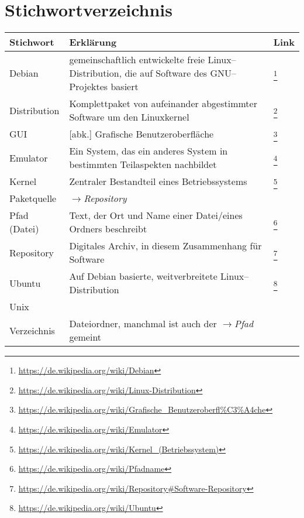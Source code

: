 \pagebreak
\section{Stichwortverzeichnis}

\begin{tabularx}{1\textwidth}{lXl}
	\textbf{Stichwort} & \textbf{Erklärung} & \textbf{Link} \\
	\hline
	Debian & gemeinschaftlich entwickelte freie Linux--Distribution, die auf Software des GNU--Projektes basiert & \footnote{\url{https://de.wikipedia.org/wiki/Debian}}\\
	Distribution & Komplettpaket von aufeinander abgestimmter Software um den Linuxkernel & \footnote{\url{https://de.wikipedia.org/wiki/Linux-Distribution}}\\
	GUI & [abk.] Grafische Benutzeroberfläche & \footnote{\url{https://de.wikipedia.org/wiki/Grafische\_Benutzeroberfl\%C3\%A4che}}\\
	Emulator & Ein System, das ein anderes System in bestimmten Teilaspekten nachbildet & \footnote{\url{https://de.wikipedia.org/wiki/Emulator}}\\
	Kernel & Zentraler Bestandteil eines Betriebssystems & \footnote{\url{https://de.wikipedia.org/wiki/Kernel\_(Betriebssystem)}}\\
	Paketquelle & \(\rightarrow\)\emph{Repository} &\\
	Pfad (Datei) & Text, der Ort und Name einer Datei/eines Ordners beschreibt & \footnote{\url{https://de.wikipedia.org/wiki/Pfadname}}\\
	Repository & Digitales Archiv, in diesem Zusammenhang für Software & \footnote{\url{https://de.wikipedia.org/wiki/Repository\#Software-Repository}}\\
	Ubuntu & Auf Debian basierte, weitverbreitete Linux--Distribution & \footnote{\url{https://de.wikipedia.org/wiki/Ubuntu}}\\
	Unix &&\\
	Verzeichnis & Dateiordner, manchmal ist auch der \(\rightarrow\)\emph{Pfad} gemeint & \\
\end{tabularx}